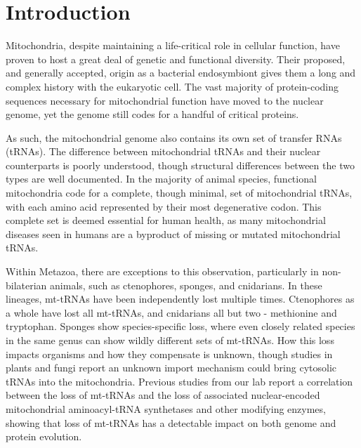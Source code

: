 \documentclass[../main.tex]{subfiles}
\begin{document}
\section{Introduction}

Mitochondria, despite maintaining a life-critical role in cellular function, have proven to host a great deal of genetic and functional diversity. Their proposed, and generally accepted, origin as a bacterial endosymbiont gives them a long and complex history with the eukaryotic cell. The vast majority of protein-coding sequences necessary for mitochondrial function have moved to the nuclear genome, yet the genome still codes for a handful of critical proteins.

 As such, the mitochondrial genome also contains its own set of transfer RNAs (tRNAs). The difference between mitochondrial tRNAs and their nuclear counterparts is poorly understood, though structural differences between the two types are well documented. In the majority of animal species, functional mitochondria code for a complete, though minimal, set of mitochondrial tRNAs, with each amino acid represented by their most degenerative codon. This complete set is deemed essential for human health, as many mitochondrial diseases seen in humans are a byproduct of missing or mutated mitochondrial tRNAs. 

Within Metazoa, there are exceptions to this observation, particularly in non-bilaterian animals, such as ctenophores, sponges, and cnidarians. In these lineages, mt-tRNAs have been independently lost multiple times. Ctenophores as a whole have lost all mt-tRNAs, and cnidarians all but two - methionine and tryptophan. Sponges show species-specific loss, where even closely related species in the same genus can show wildly different sets of mt-tRNAs. How this loss impacts organisms and how they compensate is unknown, though studies in plants and fungi report an unknown import mechanism could bring cytosolic tRNAs into the mitochondria. Previous studies from our lab report a correlation between the loss of mt-tRNAs and the loss of associated nuclear-encoded mitochondrial aminoacyl-tRNA synthetases and other modifying enzymes, showing that loss of mt-tRNAs has a detectable impact on both genome and protein evolution. 
\end{document}
